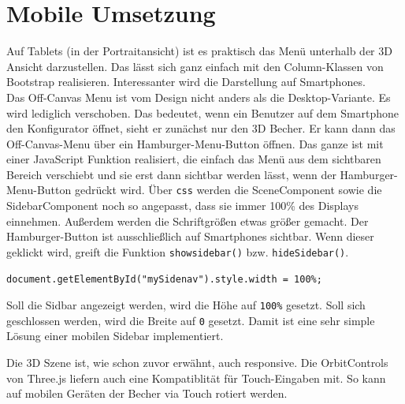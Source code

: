 \section{Mobile Umsetzung}
\label{sec:umsetzung}
%
Auf Tablets (in der Portraitansicht) ist es praktisch das Menü unterhalb der 3D Ansicht darzustellen. Das lässt sich ganz einfach mit den Column-Klassen von Bootstrap realisieren. Interessanter wird die Darstellung auf Smartphones.\\
Das Off-Canvas Menu ist vom Design nicht anders als die Desktop-Variante. Es wird lediglich verschoben. Das bedeutet, wenn ein Benutzer auf dem Smartphone den Konfigurator öffnet, sieht er zunächst nur den 3D Becher. Er kann dann das Off-Canvas-Menu über ein Hamburger-Menu-Button öffnen. Das ganze ist mit einer JavaScript Funktion realisiert, die einfach das Menü aus dem sichtbaren Bereich verschiebt und sie erst dann sichtbar werden lässt, wenn der Hamburger-Menu-Button gedrückt wird. Über \texttt{css} werden die SceneComponent sowie die SidebarComponent noch so angepasst, dass sie immer 100\% des Displays einnehmen. Außerdem werden die Schriftgrößen etwas größer gemacht.
Der Hamburger-Button ist ausschließlich auf Smartphones sichtbar. Wenn dieser geklickt wird, greift die Funktion \texttt{showsidebar()} bzw. \texttt{hideSidebar()}.
%
\begin{lstlisting}
document.getElementById("mySidenav").style.width = 100%;
\end{lstlisting}
%
Soll die Sidbar angezeigt werden, wird die Höhe auf \texttt{100\%} gesetzt. Soll sich geschlossen werden, wird die Breite auf \texttt{0} gesetzt. Damit ist eine sehr simple Lösung einer mobilen Sidebar implementiert.

Die 3D Szene ist, wie schon zuvor erwähnt, auch responsive. Die OrbitControls von Three.js liefern auch eine Kompatiblität für Touch-Eingaben mit. So kann auf mobilen Geräten der Becher via Touch rotiert werden.
%
